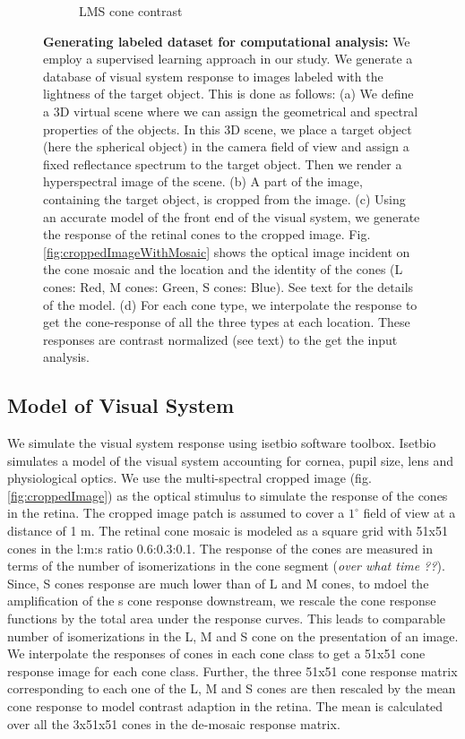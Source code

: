 \documentclass{jov}
\begin{document}
\begin{figure}
\begin{subfigure}[b]{0.2 \textwidth}
        \caption{LMS cone contrast}
        \label{fig:coneContrast}
    \end{subfigure}

    \label{fig:sceneWithCroppedImage}
    \caption{{\bf Generating labeled dataset for computational analysis:}  We employ a supervised learning approach in our study. We generate a database of visual system response to images labeled with the lightness of the target object. This is done as follows: (a) We define a 3D virtual scene where we can assign the geometrical and spectral properties of the objects. In this 3D scene, we place a target object (here the spherical object) in the camera field of view and assign a fixed reflectance spectrum to the target object. Then we render a hyperspectral image of the scene. (b) A part of the image, containing the target object, is cropped from the image. (c) Using an accurate model of the front end of the visual system, we generate the response of the retinal cones to the cropped image. Fig.\ref{fig:croppedImageWithMosaic} shows the optical image incident on the cone mosaic and the location and the identity of the cones (L cones: Red, M cones: Green, S cones: Blue). See text for the details of the model. (d) For each cone type, we interpolate the response to get the cone-response of all the three types at each location. These responses are contrast normalized (see text) to the get the input analysis.}
\end{figure}

\subsection{Model of Visual System} \label{method:Isetbio}
We simulate the visual system response using isetbio software toolbox. Isetbio simulates a model of the visual system accounting for cornea, pupil size, lens and physiological optics. We use the multi-spectral cropped image (fig.\ref{fig:croppedImage}) as the optical stimulus to simulate the response of the cones in the retina. The cropped image patch is assumed to cover a $1^{\circ}$ field of view at a distance of 1 m. The retinal cone mosaic is modeled as a square grid with 51x51 cones in the l:m:s ratio 0.6:0.3:0.1. The response of the cones are measured in terms of the number of isomerizations in the cone segment ({\it over what time ??}). Since, S cones response are much lower than of L and M cones, to mdoel the amplification of the s cone response downstream, we rescale the cone response functions by the total area under the response curves. This leads to comparable number of isomerizations in the L, M and S cone on the presentation of an image. We interpolate the responses of cones in each cone class to get a 51x51 cone response image for each cone class.  Further, the three 51x51 cone response matrix corresponding to each one of the L, M and S cones are then rescaled by the mean cone response to model contrast adaption in the retina. The mean is calculated over all the 3x51x51 cones in the de-mosaic response matrix.
\end{document}
